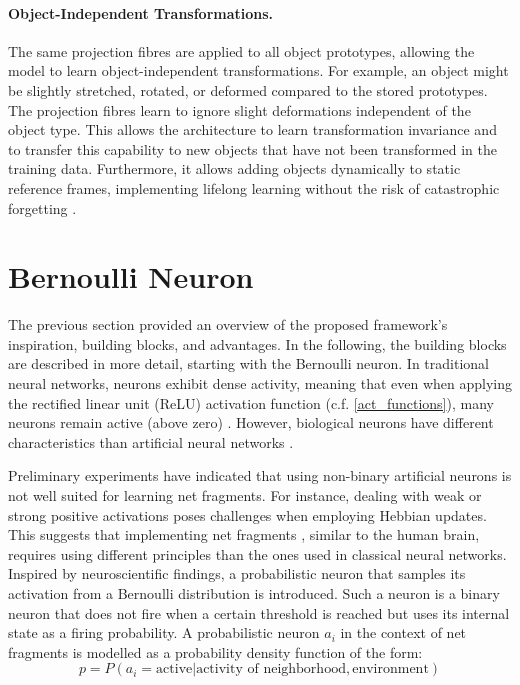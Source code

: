 \paragraph{Object-Independent Transformations.} The same projection fibres are applied to all object prototypes, allowing the model to learn object-independent transformations. For example, an object might be slightly stretched, rotated, or deformed compared to the stored prototypes. The projection fibres learn to ignore slight deformations independent of the object type. This allows the architecture to learn transformation invariance and to transfer this capability to new objects that have not been transformed in the training data.
Furthermore, it allows adding objects dynamically to static reference frames, implementing lifelong learning  without the risk of catastrophic forgetting .

\section{Bernoulli Neuron}
The previous section provided an overview of the proposed framework's inspiration, building blocks, and advantages. In the following, the building blocks are described in more detail, starting with the Bernoulli neuron.
In traditional neural networks, neurons exhibit dense activity, meaning that even when applying the rectified linear unit (ReLU) activation function (c.f. \eqref{act_functions}), many neurons remain active (above zero) . However, biological neurons have different characteristics than artificial neural networks .

Preliminary experiments have indicated that using non-binary artificial neurons is not well suited for learning net fragments. For instance, dealing with weak or strong positive activations poses challenges when employing Hebbian updates.
This suggests that implementing net fragments , similar to the human brain, requires using different principles than the ones used in classical neural networks. Inspired by neuroscientific findings, a probabilistic neuron that samples its activation from a Bernoulli distribution is introduced.
Such a neuron is a binary neuron that does not fire when a certain threshold is reached but uses its internal state as a firing probability. A probabilistic neuron $a_i$ in the context of net fragments is modelled as a probability density function of the form:
\begin{equation}
    p = P(a_i = \text{active} | \text{activity of neighborhood}, \text{environment}) 
\end{equation}

